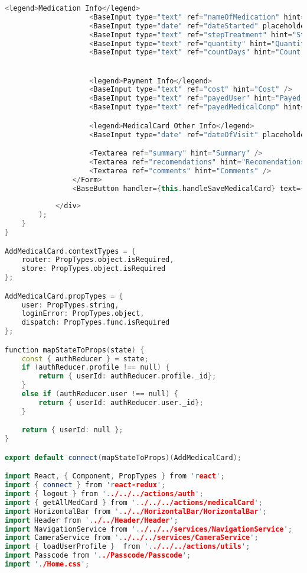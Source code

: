 \begin{lstlisting}[language=C++, style=cplusplusstyle]
                    <legend>Medication Info</legend>
                    <BaseInput type="text" ref="nameOfMedication" hint="Name Of Medication" />
                    <BaseInput type="date" ref="dateStarted" placeholder="date Started" />
                    <BaseInput type="text" ref="stepTreatment" hint="Step Treatment" />
                    <BaseInput type="text" ref="quantity" hint="Quantity" />
                    <BaseInput type="text" ref="countDays" hint="Count Days" />


                    <legend>Payment Info</legend>
                    <BaseInput type="text" ref="cost" hint="Cost" />
                    <BaseInput type="text" ref="payedUser" hint="Payed User" />
                    <BaseInput type="text" ref="payedMedicalComp" hint="Payed Medical Comp" />

                    <legend>MedicalCard Other Info</legend>
                    <BaseInput type="date" ref="dateOfVisit" placeholder="Password (hint: password)" />

                    <Textarea ref="summary" hint="Summary" />
                    <Textarea ref="recomendations" hint="Recomendations" />
                    <Textarea ref="comments" hint="Comments" />
                </Form>
                <BaseButton handler={this.handleSaveMedicalCard} text={'Save Medical Card'}/>
                
            </div>
        );
    }
}

AddMedicalCard.contextTypes = {
    router: PropTypes.object.isRequired,
    store: PropTypes.object.isRequired
};

AddMedicalCard.propTypes = {
    user: PropTypes.string,
    loginError: PropTypes.object,
    dispatch: PropTypes.func.isRequired
};

function mapStateToProps(state) {
    const { authReducer } = state;
    if (authReducer.profile !== null) {
        return { userId: authReducer.profile._id};
    }
    else if (authReducer.user !== null) { 
        return { userId: authReducer.user._id};
    }

    return { userId: null };
}

export default connect(mapStateToProps)(AddMedicalCard);

import React, { Component, PropTypes } from 'react';
import { connect } from 'react-redux';
import { logout } from '../../../actions/auth';
import { getAllMedCard } from '../../../actions/medicalCard';
import HorizontalBar from '../../HorizontalBar/HorizontalBar';
import Header from '../../Header/Header';
import NavigationService from '../../../services/NavigationService';
import CameraService from '../../../services/CameraService';
import { loadUserProfile }  from '../../../actions/utils';
import Passcode from '../Passcode/Passcode';
import './Home.css';


\end{lstlisting}
